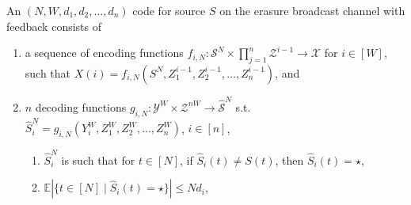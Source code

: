 \begin{mydef}
\label{def:code_two_users_feedback}
	An $(N, W, d_{1}, d_{2}, \ldots, d_{n})$ code for source $S$ on the erasure broadcast channel with feedback consists of	
	\begin{enumerate}
		\item a sequence of encoding functions $f_{i, N} : \mathcal{S}^{N} \times  \prod_{j = 1}^{n} \mathcal{Z}^{i-1} \to \mathcal{X}$ for $i \in [W]$, such that $X(i) = f_{i, N}(S^{N}, Z_1^{i -1}, Z_2^{i -1}, \ldots, Z_n^{i - 1})$, and
		
		\item $n$ decoding functions $g_{i,N} : \mathcal{Y}^{W} \times  \mathcal{Z}^{nW} \to \mathcal{\hat{S}}^{N}$ s.t.\ $\hat{S}_{i}^{N} = g_{i,N}(Y_{i}^{W}, Z_1^{W}, Z_2^{W}, \ldots, Z_n^{W})$, $i \in [n]$,
		\begin{enumerate}
			\item $\hat{S}_{i}^{N}$ is such that for $t \in [N]$, if $\hat{S}_{i}(t) \neq S(t)$, then $\hat{S}_{i}(t) = \star$,
			\item $\mathbb{E}   \left\vert{\{t \in [N] \mid \hat{S}_{i}(t) = \star\}}\right\vert \leq N d_{i}$,
		\end{enumerate}
		 	
	\end{enumerate}
	
\end{mydef}

